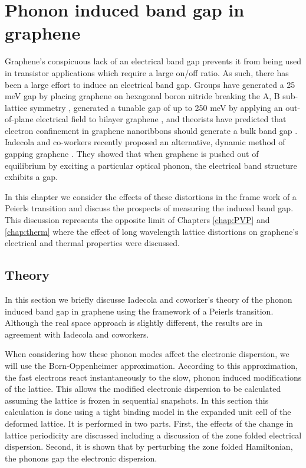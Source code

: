\chapter{Phonon induced band gap in graphene \label{chap:kek}}
Graphene's conspicuous lack of an electrical band gap prevents it from being used in transistor applications which require a large on/off ratio.
As such, there has been a large effort to induce an electrical band gap.
Groups have generated a 25 meV gap by placing graphene on hexagonal boron nitride breaking the A, B sub-lattice symmetry \cite{Hunt2013}, generated a tunable gap of up to 250 meV by applying an out-of-plane electrical field to bilayer graphene \cite{Zhang2009}, and theorists have predicted that electron confinement in graphene nanoribbons should generate a bulk band gap \cite{CastroNeto2009}.
Iadecola and co-workers recently proposed an alternative, dynamic method of gapping graphene \cite{Iadecola2013,Iadecola2013a}.
They showed that when graphene is pushed out of equilibrium by exciting a particular optical phonon, the electrical band structure exhibits a gap. 

In this chapter we consider the effects of these distortions in the frame work of a Peierls transition and discuss the prospects of measuring the induced band gap.
This discussion represents the opposite limit of Chapters \ref{chap:PVP} and \ref{chap:therm} where the effect of long wavelength lattice distortions on graphene's electrical and thermal properties were discussed.

\section{Theory}
In this section we briefly discusse Iadecola and coworker's theory of the phonon induced band gap in graphene using the framework of a Peierls transition.
Although the real space approach is slightly different, the results are in agreement with Iadecola and coworkers.

When considering how these phonon modes affect the electronic dispersion, we will use the Born-Oppenheimer approximation.
According to this approximation, the fast electrons react instantaneously to the slow, phonon induced modifications of the lattice.
This allows the modified electronic dispersion to be calculated assuming the lattice is frozen in sequential snapshots.
In this section this calculation is done using a tight binding model in the expanded unit cell of the deformed lattice.
It is performed in two parts.
First, the effects of the change in lattice periodicity are discussed including a discussion of the zone folded electrical dispersion.
Second, it is shown that by perturbing the zone folded Hamiltonian, the phonons gap the electronic dispersion.

